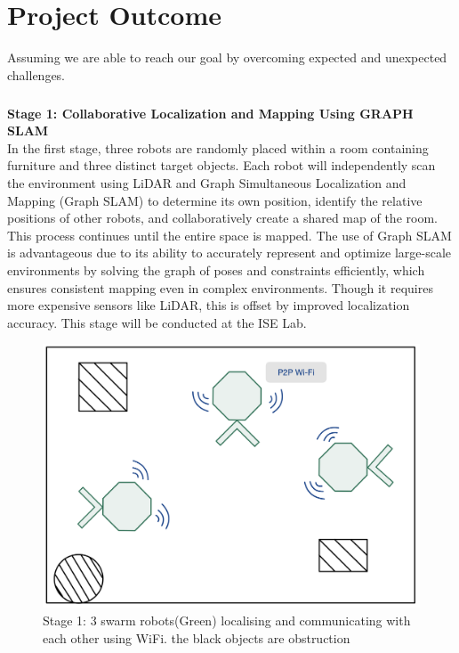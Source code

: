 \chapter{Project Outcome}

Assuming we are able to reach our goal by overcoming expected and unexpected challenges. 

\paragraph*{}
\textbf{Stage 1: Collaborative Localization and Mapping Using GRAPH SLAM} \\
In the first stage, three robots are randomly placed within a room containing furniture and three distinct target objects. Each robot will independently scan the environment using LiDAR and Graph Simultaneous Localization and Mapping (Graph SLAM) to determine its own position, identify the relative positions of other robots, and collaboratively create a shared map of the room. This process continues until the entire space is mapped. The use of Graph SLAM is advantageous due to its ability to accurately represent and optimize large-scale environments by solving the graph of poses and constraints efficiently, which ensures consistent mapping even in complex environments. Though it requires more expensive sensors like LiDAR, this is offset by improved localization accuracy. This stage will be conducted at the ISE Lab.

\begin{figure}
    \centering
    \includegraphics[width=0.5\linewidth]{assets/images/project_outcome/stage_1.png}
    \caption{Stage 1: 3 swarm robots(Green) localising and communicating with each other using WiFi. the black objects are obstruction}
    \label{fig:phase1}
\end{figure}

